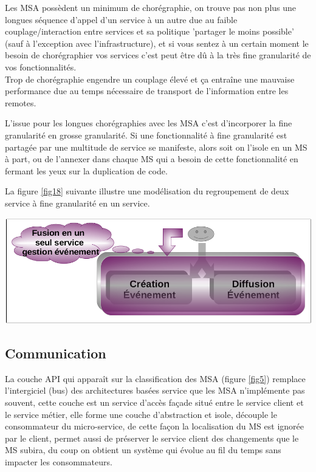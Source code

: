 \documentclass[12pt, a4paper, openany]{report}
\begin{document}
    Les MSA possèdent un minimum de chorégraphie, on trouve pas non plus une longues séquence d'appel d'un service à un autre due au faible couplage/interaction entre services et sa politique 'partager le moins possible' (sauf à l'exception avec l'infrastructure), et si vous sentez à un certain moment le besoin de chorégraphier vos services c'est peut être dû à la très fine granularité de vos fonctionnalités.\\
     
    Trop de chorégraphie engendre un couplage élevé et ça entraîne une mauvaise performance due au temps nécessaire de transport de l'information entre les remotes. 
    
    L'issue pour les longues chorégraphies avec les MSA c'est d'incorporer la fine granularité en grosse granularité. Si une fonctionnalité à fine granularité est partagée par une multitude de service se manifeste, alors soit on l'isole en un MS à part, ou de l'annexer dans chaque MS qui a besoin de cette fonctionnalité en fermant les yeux sur la duplication de code.
   
   La figure \ref{fig18} suivante illustre une modélisation du regroupement de deux service à fine granularité en un service.\\
   
    \begin{center}
      \includegraphics[scale=0.3]{fusion_service_18.png}
      \label{fig18}
    \end{center}
    
    
   \subsection{Communication} %
   
    La couche API qui apparaît sur la classification des MSA (figure \ref{fig5}) remplace l'intergiciel (bus) des architectures basées service que les MSA n’implémente pas souvent, cette couche est un service d’accès façade situé entre le service client et le service métier, elle forme une couche d'abstraction et isole, découple le consommateur du micro-service, de cette façon la localisation du MS est ignorée par le client, permet aussi de préserver le service client des changements que le MS subira, du coup on obtient un système qui évolue au fil du temps sans impacter les consommateurs.
    
\end{document}
